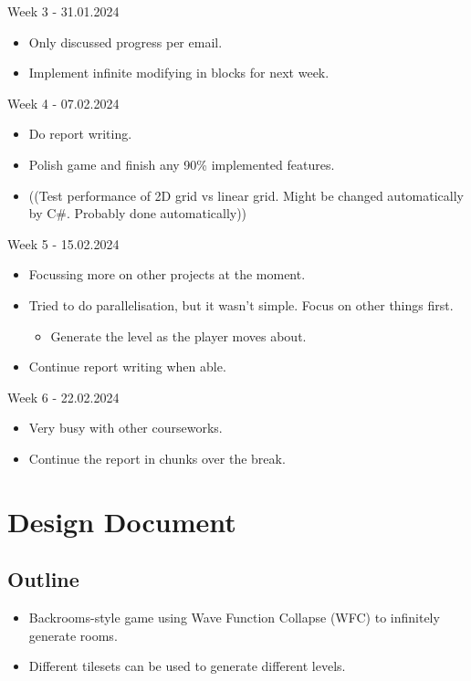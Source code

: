 \noindent Week 3 - 31.01.2024
\begin{itemize}
    \item Only discussed progress per email.
    \item Implement infinite modifying in blocks for next week.
\end{itemize}

\noindent Week 4 - 07.02.2024
\begin{itemize}
    \item Do report writing.
    \item Polish game and finish any 90\% implemented features.
    \item ((Test performance of 2D grid vs linear grid. Might be changed automatically by C\#. Probably done automatically))
\end{itemize}

\noindent Week 5 - 15.02.2024
\begin{itemize}
    \item Focussing more on other projects at the moment.
    \item Tried to do parallelisation, but it wasn’t simple. Focus on other things first.
          \begin{itemize}
              \item Generate the level as the player moves about.
          \end{itemize}
    \item Continue report writing when able.
\end{itemize}

\noindent Week 6 - 22.02.2024
\begin{itemize}
    \item Very busy with other courseworks.
    \item Continue the report in chunks over the break.
\end{itemize}


\chapter{Design Document}\label{sec:designDocument}
\section*{Outline}
\begin{itemize}
    \item Backrooms-style game using Wave Function Collapse (WFC) to infinitely generate rooms.
    \item Different tilesets can be used to generate different levels.
\end{itemize}

